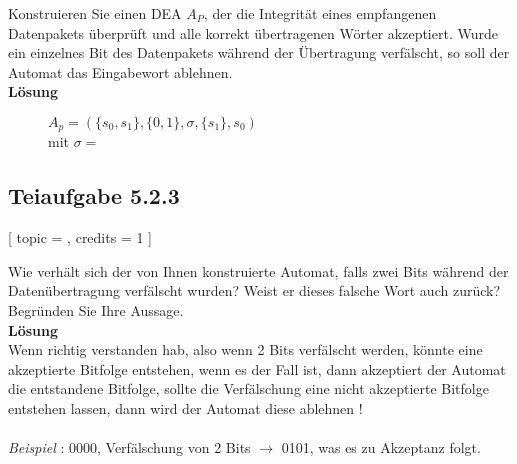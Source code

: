 \documentclass[12pt]{article}
\begin{document}
 Konstruieren Sie einen DEA $A_P$, der die Integrität eines empfangenen Datenpakets überprüft 
 und alle korrekt übertragenen Wörter akzeptiert. Wurde ein einzelnes Bit des Datenpakets 
 während der Übertragung verfälscht, so soll der Automat das Eingabewort ablehnen. 
  \\ 
\textbf{  Lösung
}\\


  
 \begin{figure}[h] 
   $A_p = (\{s_0,s_1\},\{0,1\},\sigma,\{s_1\},s_0)$ \\ mit $\sigma =$ \\

 \centering 
  
 \end{figure} 
  
 \subsection*{Teiaufgabe 5.2.3}[ 
 topic = , 
 credits = 1 
 ] 
  
 Wie verhält sich der von Ihnen konstruierte Automat, falls zwei Bits während der Datenübertragung 
 verfälscht wurden? Weist er dieses falsche Wort auch zurück? Begründen Sie Ihre Aussage. \\
  
  \textbf{Lösung}
 \\
 Wenn richtig verstanden hab, also wenn 2 Bits verfälscht werden, könnte eine akzeptierte Bitfolge entstehen, wenn es der Fall ist, dann akzeptiert der Automat die entstandene Bitfolge, sollte die Verfälschung eine nicht akzeptierte Bitfolge entstehen lassen, dann wird der Automat diese ablehnen !\\\\
 \textit{Beispiel} : 0000, Verfälschung von 2 Bits $\rightarrow$ 0101, was es zu Akzeptanz folgt.
\end{document}
